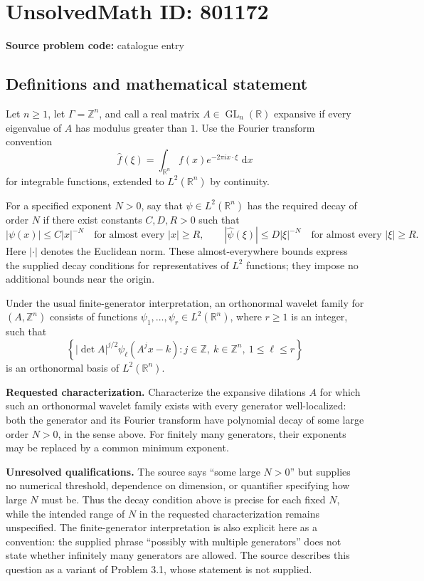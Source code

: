 \documentclass[11pt]{article}
\newcommand{\Z}{\mathbb{Z}}
\newcommand{\R}{\mathbb{R}}
\newcommand{\dd}{\,\mathrm{d}}
\begin{document}
\section*{UnsolvedMath ID: 801172}
\textbf{Source problem code:} catalogue entry
\subsection{Definitions and mathematical statement}
Let \(n\geq 1\), let \(\Gamma=\Z^n\), and call a real matrix \(A\in\operatorname{GL}_n(\R)\) expansive if every eigenvalue of \(A\) has modulus greater than \(1\). Use the Fourier transform convention
\[
\widehat f(\xi)=\int_{\R^n}f(x)e^{-2\pi i x\cdot\xi}\,\dd x
\]
for integrable functions, extended to \(L^2(\R^n)\) by continuity.

For a specified exponent \(N>0\), say that \(\psi\in L^2(\R^n)\) has the required decay of order \(N\) if there exist constants \(C,D,R>0\) such that
\[
|\psi(x)|\leq C|x|^{-N}\quad\text{for almost every }|x|\geq R,
\qquad
|\widehat\psi(\xi)|\leq D|\xi|^{-N}\quad\text{for almost every }|\xi|\geq R.
\]
Here \(|\cdot|\) denotes the Euclidean norm. These almost-everywhere bounds express the supplied decay conditions for representatives of \(L^2\) functions; they impose no additional bounds near the origin.

Under the usual finite-generator interpretation, an orthonormal wavelet family for \((A,\Z^n)\) consists of functions \(\psi_1,\ldots,\psi_r\in L^2(\R^n)\), where \(r\geq1\) is an integer, such that
\[
\left\{|\det A|^{j/2}\psi_\ell(A^j x-k):
 j\in\Z,\ k\in\Z^n,\ 1\leq\ell\leq r\right\}
\]
is an orthonormal basis of \(L^2(\R^n)\).

\textbf{Requested characterization.} Characterize the expansive dilations \(A\) for which such an orthonormal wavelet family exists with every generator well-localized: both the generator and its Fourier transform have polynomial decay of some large order \(N>0\), in the sense above. For finitely many generators, their exponents may be replaced by a common minimum exponent.

\textbf{Unresolved qualifications.} The source says ``some large \(N>0\)'' but supplies no numerical threshold, dependence on dimension, or quantifier specifying how large \(N\) must be. Thus the decay condition above is precise for each fixed \(N\), while the intended range of \(N\) in the requested characterization remains unspecified. The finite-generator interpretation is also explicit here as a convention: the supplied phrase ``possibly with multiple generators'' does not state whether infinitely many generators are allowed. The source describes this question as a variant of Problem 3.1, whose statement is not supplied.
\end{document}
